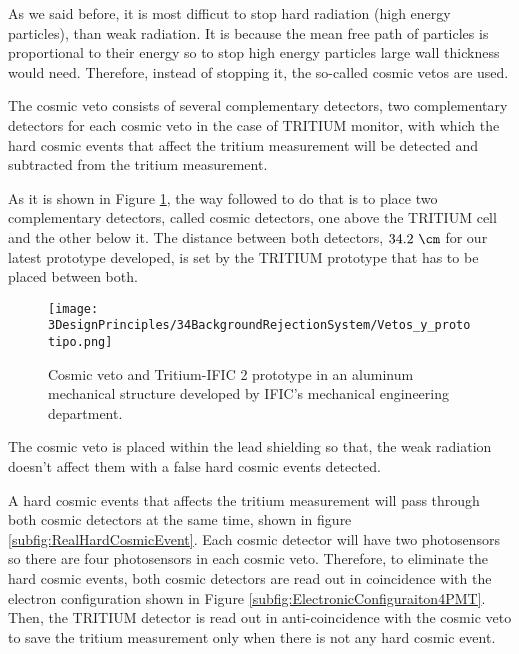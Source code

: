 As we said before, it is most difficut to stop hard radiation (high energy particles), than weak radiation. It is because the mean free path of particles is proportional to their energy so to stop high energy particles large wall thickness would need. Therefore, instead of stopping it, the so-called cosmic vetos are used.

The cosmic veto consists of several complementary detectors, two complementary detectors for each cosmic veto in the case of TRITIUM monitor, with which the hard cosmic events that affect the tritium measurement will be detected and subtracted from the tritium measurement.

As it is shown in Figure \ref{fig:VetoAndPrototype}, the way followed to do that is to place two complementary detectors, called cosmic detectors, one above the TRITIUM cell and the other below it. The distance between both detectors, $34.2~\cm$ for our latest prototype developed, is set by the TRITIUM prototype that has to be placed between both.

\begin{figure}[h]
\centering
\texttt{[image: 3DesignPrinciples/34BackgroundRejectionSystem/Vetos\_y\_prototipo.png]}
\caption{Cosmic veto and Tritium-IFIC 2 prototype in an aluminum mechanical structure developed by IFIC's mechanical engineering department.\label{fig:VetoAndPrototype}}
\end{figure}

The cosmic veto is placed within the lead shielding so that, the weak radiation doesn't affect them with a false hard cosmic events detected.

A hard cosmic events that affects the tritium measurement will pass through both cosmic detectors at the same time, shown in figure \ref{subfig:RealHardCosmicEvent}. Each cosmic detector will have two photosensors so there are four photosensors in each cosmic veto. Therefore,  to eliminate the hard cosmic events, both cosmic detectors are read out in coincidence with the electron configuration shown in Figure \ref{subfig:ElectronicConfiguraiton4PMT}. Then, the TRITIUM detector is read out in anti-coincidence with the cosmic veto to save the tritium measurement only when there is not any hard cosmic event. 



